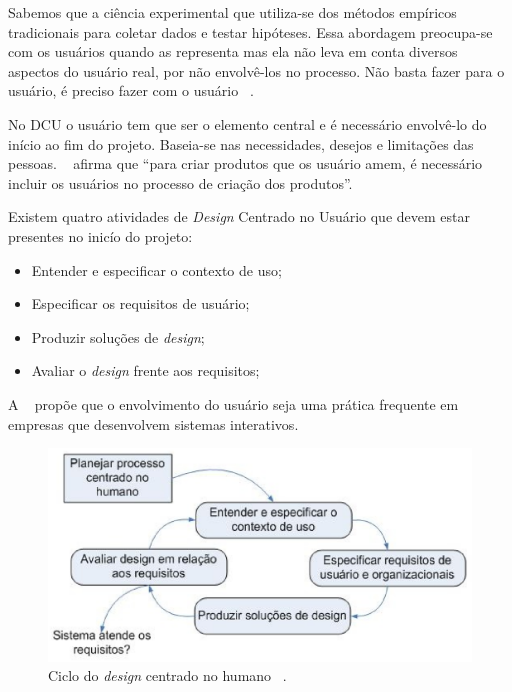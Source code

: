 Sabemos que a ciência experimental que utiliza-se dos métodos empíricos tradicionais para coletar dados e testar hipóteses. Essa abordagem preocupa-se com os usuários quando as representa mas ela não leva em conta diversos aspectos do usuário real, por não envolvê-los no processo. Não basta fazer para o usuário, é preciso fazer com o usuário ~\cite{eason1995}. 

No DCU o usuário tem que ser o elemento central e é necessário envolvê-lo do início ao fim do projeto. Baseia-se nas necessidades, desejos e limitações das pessoas. ~ afirma que ``para criar produtos que os usuário amem, é necessário incluir os usuários no processo de criação dos produtos''. 


Existem quatro atividades de \emph{Design} Centrado no Usuário que devem estar presentes no inicío do projeto:

\begin{itemize}
\item Entender e especificar o contexto de uso;
\item Especificar os requisitos de usuário;
\item Produzir soluções de \emph{design};
\item Avaliar o \emph{design} frente aos requisitos;
\end{itemize}

A ~ propõe que o envolvimento do usuário seja uma prática frequente em empresas que desenvolvem sistemas interativos.

\begin{figure}[h]
    \centering
    \includegraphics[keepaspectratio=true,scale=0.60]
      {figuras/ciclo_iso13407.eps}
    \caption{Ciclo do \emph{design} centrado no humano ~\cite{iso:13407}.}
    \label{ciclo_iso13407}
\end{figure}

